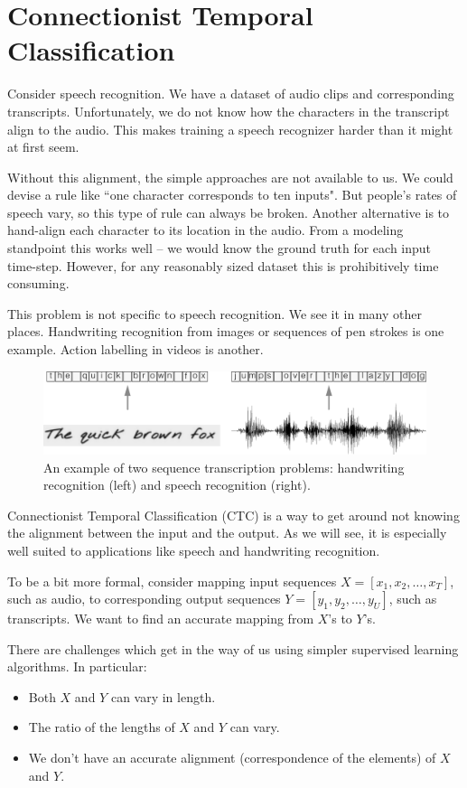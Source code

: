 \section{Connectionist Temporal Classification}

Consider speech recognition. We have a dataset of audio clips and corresponding
transcripts. Unfortunately, we do not know how the characters in the transcript
align to the audio. This makes training a speech recognizer harder than it
might at first seem.

Without this alignment, the simple approaches are not available to us. We could
devise a rule like ``one character corresponds to ten inputs". But people's
rates of speech vary, so this type of rule can always be broken.  Another
alternative is to hand-align each character to its location in the audio. From
a modeling standpoint this works well -- we would know the ground truth for
each input time-step. However, for any reasonably sized dataset this is
prohibitively time consuming.

This problem is not specific to speech recognition. We see it in many other
places. Handwriting recognition from images or sequences of pen strokes is one
example. Action labelling in videos is another.

\begin{figure}
\centering
\includegraphics[width=\textwidth]{background/figures/asr_hrr.pdf}
\caption{An example of two sequence transcription problems: handwriting
    recognition (left) and speech recognition (right).}
\label{fig:bg:asr_hrr} 
\end{figure}

Connectionist Temporal Classification (CTC) is a way to get around not knowing
the alignment between the input and the output. As we will see, it is
especially well suited to applications like speech and handwriting recognition.

To be a bit more formal, consider mapping input sequences $X = [x_1, x_2,
\ldots, x_T]$, such as audio, to corresponding output sequences $Y = [y_1, y_2,
\ldots, y_U]$, such as transcripts.  We want to find an accurate mapping from
$X$'s to $Y$'s.

There are challenges which get in the way of us using simpler supervised
learning algorithms. In particular:
\begin{itemize}
  \item Both $X$ and $Y$ can vary in length.
  \item The ratio of the lengths of $X$ and $Y$ can vary.
  \item We don't have an accurate alignment (correspondence of the elements) of
  $X$ and $Y$.
\end{itemize}

